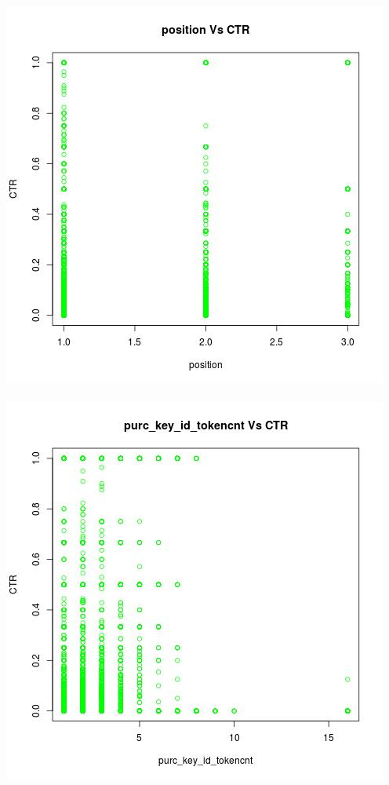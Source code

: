 \documentclass[10pt]{article}
\begin{document}
\includegraphics[scale=0.5]{position_Vs_CTR}\\\\
\includegraphics[scale=0.5]{purc_key_id_tokencnt_Vs_CTR}
\end{document}
